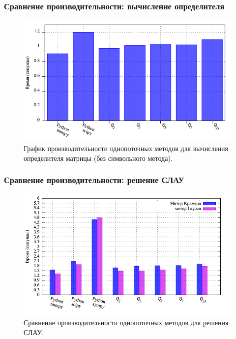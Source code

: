 \documentclass[10pt,professionalfont,utf8,presentation,compress]{beamer}
\theoremstyle{definition}
\theoremstyle{plain}
\begin{document}
\begin{frame}
\frametitle{Сравнение производительности: вычисление определителя}
\begin{figure}[H]
\centerline{\includegraphics[width=0.95\linewidth]{../gnuplot/single/det/wosymb.png}}
\caption{График производительности однопоточных методов для вычисления определителя матрицы (без символьного метода).}
\label{img:single:det:2}
\end{figure}
\end{frame}

\begin{frame}
\frametitle{Сравнение производительности: решение СЛАУ}
\begin{figure}[H]
\centerline{\includegraphics[width=0.95\linewidth]{../gnuplot/single/system/plot.png}}
\caption{Сравнение производительности однопоточных методов для решения СЛАУ.}
\label{img:single:system:1}
\end{figure}
\end{frame}
\end{document}
